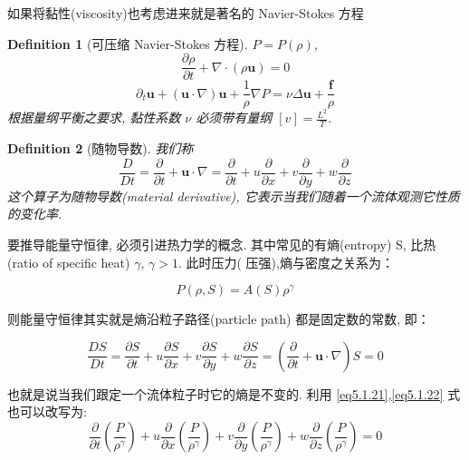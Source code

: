 \documentclass[11pt]{article}
\newtheorem{definition}{Definition}[subsection]
\begin{document}
如果将黏性(viscosity)也考虑进来就是著名的 Navier-Stokes 方程

\begin{definition}[\kaishu 可压缩 Navier-Stokes 方程]
	$ P = P(\rho) $,
	\begin{equation}
	\frac{{\partial \rho }}{{\partial t}} + \nabla  \cdot \left( {\rho \boldsymbol{u}} \right) = 0
	\label{eq5.1.18}
	\end{equation}
	\begin{equation}
	{\partial _t}\boldsymbol{u} + \left( {\boldsymbol{u} \cdot \nabla } \right)\boldsymbol{u} + \frac{1}{\rho }\nabla P = \nu \Delta \boldsymbol{u} + \frac{\boldsymbol{f}}{\rho }
	\label{eq5.1.19}
	\end{equation}
	根据量纲平衡之要求, 黏性系数 $ \nu  $ 必须带有量纲 $\left[ v \right] = \frac{{{L^2}}}{T}$. 
\end{definition}

\begin{definition}[\kaishu 随物导数]
	我们称
	\begin{equation}
	\frac{D}{{Dt}} = \frac{\partial }{{\partial t}} + \boldsymbol{u} \cdot \nabla  = \frac{\partial }{{\partial t}} + u\frac{\partial }{{\partial x}} + v\frac{\partial }{{\partial y}} + w\frac{\partial }{{\partial z}}
	\label{eq5.1.20}
	\end{equation}
	这个算子为随物导数(material derivative), 它表示当我们随着一个流体观测它性质的变化率.
\end{definition}

要推导能量守恒律, 必须引进热力学的概念. 其中常见的有熵(entropy) S, 比热(ratio of specific heat) $ \gamma $, $ \gamma > 1 $. 此时压力({\color{red} 压强}),熵与密度之关系为：

\begin{equation}
P(\rho, S) = A(S) \rho^{\gamma}
\label{eq5.1.21}
\end{equation}

则能量守恒律其实就是熵沿粒子路径(particle path) 都是固定数的常数, 即：

\begin{equation}
\frac{{DS}}{{Dt}} = \frac{{\partial S}}{{\partial t}} + u\frac{{\partial S}}{{\partial x}} + v\frac{{\partial S}}{{\partial y}} + w\frac{{\partial S}}{{\partial z}} = \left( {\frac{\partial }{{\partial t}} + \boldsymbol{u} \cdot \nabla } \right)S = 0
\label{eq5.1.22}
\end{equation}

也就是说当我们跟定一个流体粒子时它的熵是不变的. 利用 \ref{eq5.1.21},\ref{eq5.1.22} 式也可以改写为:
\begin{equation}
\frac{\partial }{{\partial t}}\left( {\frac{P}{{{\rho ^\gamma }}}} \right) + u\frac{\partial }{{\partial x}}\left( {\frac{P}{{{\rho ^\gamma }}}} \right) + v\frac{\partial }{{\partial y}}\left( {\frac{P}{{{\rho ^\gamma }}}} \right) + w\frac{\partial }{{\partial z}}\left( {\frac{P}{{{\rho ^\gamma }}}} \right) = 0
\label{eq5.1.23}
\end{equation}
\end{document}
